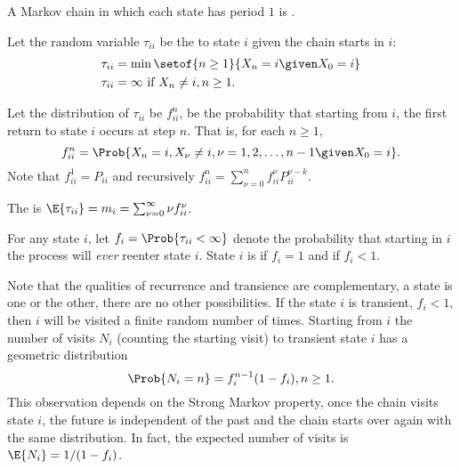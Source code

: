 \documentclass[12pt]{article}
\begin{document}
\begin{enumerate}
\begin{definition}
    A Markov chain in which each state has period \( 1 \) is .
\end{definition}

\begin{definition}
    Let the random variable \( \tau_{ii} \) be the  to
    state \( i \) given the chain starts in \( i \):
    \begin{align*}
        \tau_{ii} &= \min\setof{n \ge 1}{X_n = i \given X_0 = i} \\
        \tau_{ii} &= \infty \text{ if } X_n \ne i, n \ge 1.
    \end{align*}
\end{definition}

\begin{definition}
    Let the distribution of \( \tau_{ii} \) be \( f^n_{ii} \), be the
    probability that starting from \( i \), the first return to state \(
    i \) occurs at step \( n \).  That is, for each \( n \ge 1 \),
    \[
        f^n_{ii} = \Prob{X_n = i, X_\nu \ne i, \nu =1,2,\dots,n-1 \given
        X_0 = i}.
    \] Note that \( f^1_{ii} = P_{ii} \) and recursively \( f^n_{ii} =
    \sum_{\nu=0}^n f^{\nu}_{ii} P^{\nu-k}_{ii} \).
\end{definition}

\begin{definition}
    The  is \( \E{\tau_{ii}} = m_i = \sum_{\nu=0}^
    {\infty} \nu f^\nu_{ii} \).
\end{definition}

\begin{definition}
    For any state \( i \), let \( f_i = \Prob{\tau_{ii} < \infty} \)
    denote the probability that starting in \( i \) the process will
    \emph{ever} reenter state \( i \). State \( i \) is 
    if \( f_i = 1 \) and  if \( f_{i} < 1 \).
\end{definition}

\begin{remark}
    Note that the qualities of recurrence and transience are
    complementary, a state is one or the other, there are no other
    possibilities. If the state \( i \) is transient, \( f_i < 1 \),
    then \( i \) will be visited a finite random number of times.
    Starting from \( i \) the number of visits \( N_i \) (counting the
    starting visit) to transient state \( i \) has a geometric
    distribution
    \[
        \Prob{N_i = n} = f_i^{n-1}(1 - f_i), n \ge 1.
    \] This observation depends on the Strong Markov property, once the
    chain visits state \( i \), the future is independent of the past
    and the chain starts over again with the same distribution.  In
    fact, the expected number of visits is \( \E{N_i} = 1/(1 - f_i) \).
\end{remark}


\end{enumerate}
\end{document}
